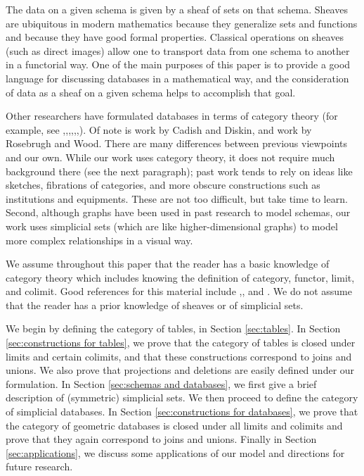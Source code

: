 \documentclass{amsart}
\begin{document}
The data on a given schema is given by a sheaf of sets on that schema.  Sheaves are ubiquitous in modern mathematics because they generalize sets and functions and because they have good formal properties.  Classical operations on sheaves (such as direct images) allow one to transport data from one schema to another in a functorial way.  One of the main purposes of this paper is to provide a good language for discussing databases in a mathematical way, and the consideration of data as a sheaf on a given schema helps to accomplish that goal.

Other researchers have formulated databases in terms of category theory (for example, see \cite{RW},\cite{JRW},\cite{PS},\cite{Ber},\cite{DK},\cite{Dis},\cite{GB}).  Of note is work by Cadish and Diskin, and work by Rosebrugh and Wood.  There are many differences between previous viewpoints and our own.  While our work uses category theory, it does not require much background there (see the next paragraph); past work tends to rely on ideas like sketches, fibrations of categories, and more obscure constructions such as institutions and equipments.  These are not too difficult, but take time to learn.  Second, although graphs have been used in past research to model schemas, our work uses simplicial sets (which are like higher-dimensional graphs) to model more complex relationships in a visual way.  

We assume throughout this paper that the reader has a basic knowledge of category theory which includes knowing the definition of category, functor, limit, and colimit.  Good references for this material include \cite{Mac},\cite{BW}, and \cite{Bor1}.  We do not assume that the reader has a prior knowledge of sheaves or of simplicial sets.

We begin by defining the category of tables, in Section \ref{sec:tables}.  In Section \ref{sec:constructions for tables}, we prove that the category of tables is closed under limits and certain colimits, and that these constructions correspond to joins and unions.  We also prove that projections and deletions are easily defined under our formulation.  In Section \ref{sec:schemas and databases}, we first give a brief description of (symmetric) simplicial sets.  We then proceed to define the category of simplicial databases.  In Section \ref{sec:constructions for databases}, we prove that the category of geometric databases is closed under all limits and colimits and prove that they again correspond to joins and unions.  Finally in Section \ref{sec:applications}, we discuss some applications of our model and directions for future research.
\end{document}
